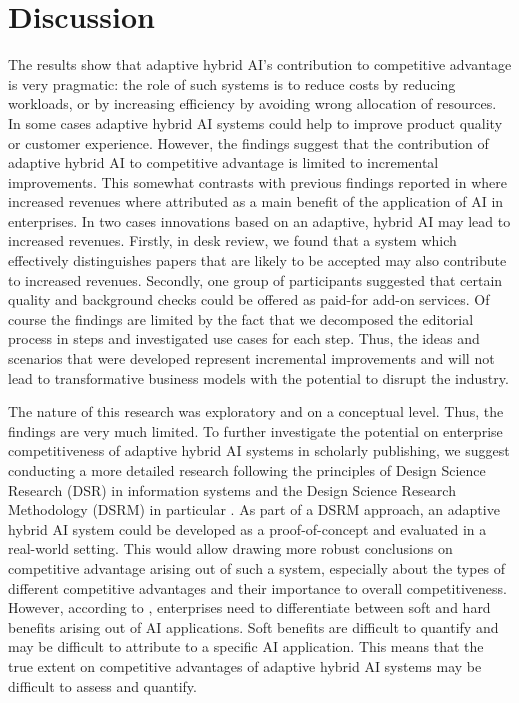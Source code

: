 \section{Discussion}
\label{sec:discussion}

The results show that adaptive hybrid AI's contribution to competitive advantage is very pragmatic: the role of such systems 
is to reduce costs by reducing workloads, or by increasing efficiency by avoiding wrong allocation of resources. In some cases 
adaptive hybrid AI systems could help to improve product quality or customer experience. However, the findings suggest that 
the contribution of adaptive hybrid AI to competitive advantage is limited to incremental improvements. This somewhat contrasts
with previous findings reported in \citet{balakrishnanGlobalSurveyState2020} where increased revenues where attributed as a main
benefit of the application of AI in enterprises.
In two cases innovations based on an adaptive, hybrid AI may lead to increased revenues. Firstly, in desk review, we found that a
system which effectively distinguishes papers that are likely to be accepted may also contribute to increased revenues. Secondly,
one group of participants suggested that certain quality and background checks could be offered as paid-for add-on services.
Of course the findings are limited by the fact that we decomposed the editorial process in steps and investigated use cases
for each step. Thus, the ideas and scenarios that were developed represent incremental improvements and will not lead to 
transformative business models with the potential to disrupt the industry.

The nature of this research was exploratory and on a conceptual level. Thus, the findings are very much limited. To further
investigate the potential on enterprise competitiveness of adaptive hybrid AI systems in scholarly publishing, we suggest
conducting a more detailed research following the principles of Design Science Research (DSR) in information systems \citep{hevnerDesignScienceInformation2004,
vaishnaviDesignResearchInformation2004} and the Design Science Research Methodology (DSRM) in particular \citep{peffersDesignScienceResearch2007}. 
As part of a DSRM approach, an adaptive hybrid AI system could be developed as a proof-of-concept and evaluated in a real-world
setting. This would allow drawing more robust conclusions on competitive advantage arising out of such a system, especially about 
the types of different competitive advantages and their importance to overall competitiveness. However, according
to \citet{gudigantalaAIDecisionmakingFramework2023}, enterprises need to differentiate between soft and hard benefits arising out
of AI applications. Soft benefits are difficult to quantify and may be difficult to attribute to a specific AI application. This 
means that the true extent on competitive advantages of adaptive hybrid AI systems may be difficult to assess and quantify.
